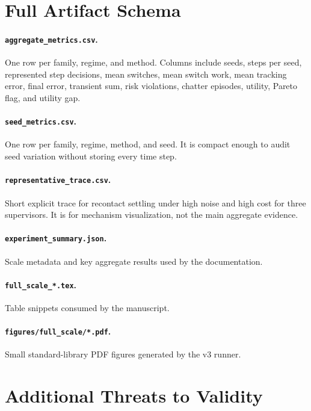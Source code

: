\documentclass{article}
\begin{document}
\section{Full Artifact Schema}

\paragraph{\texttt{aggregate\_metrics.csv}.}
One row per family, regime, and method.
Columns include seeds, steps per seed, represented step decisions, mean switches, mean switch work, mean tracking error, final error, transient sum, risk violations, chatter episodes, utility, Pareto flag, and utility gap.

\paragraph{\texttt{seed\_metrics.csv}.}
One row per family, regime, method, and seed.
It is compact enough to audit seed variation without storing every time step.

\paragraph{\texttt{representative\_trace.csv}.}
Short explicit trace for recontact settling under high noise and high cost for three supervisors.
It is for mechanism visualization, not the main aggregate evidence.

\paragraph{\texttt{experiment\_summary.json}.}
Scale metadata and key aggregate results used by the documentation.

\paragraph{\texttt{full\_scale\_*.tex}.}
Table snippets consumed by the manuscript.

\paragraph{\texttt{figures/full\_scale/*.pdf}.}
Small standard-library PDF figures generated by the v3 runner.

\section{Additional Threats to Validity}
\end{document}
